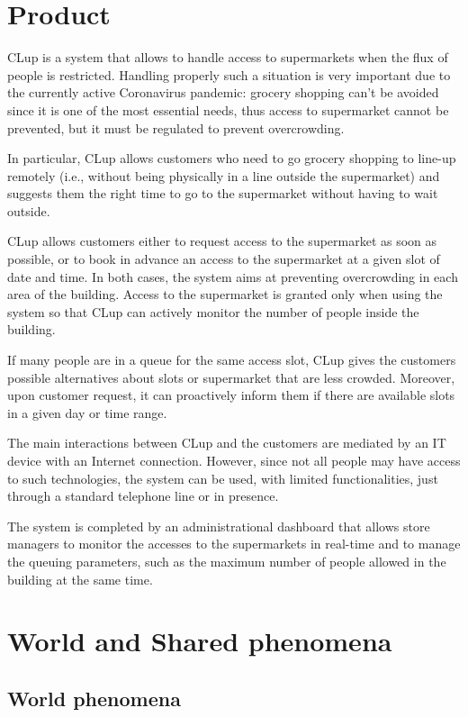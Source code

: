 \documentclass[../../main.tex]{subfiles}
\begin{document}
\section{Product}

CLup is a system that allows to handle access to supermarkets when the flux of
people is restricted. Handling properly such a situation is very important due
to the currently active Coronavirus pandemic: grocery shopping can't be avoided
since it is one of the most essential needs, thus access to supermarket cannot
be prevented, but it must be regulated to prevent overcrowding.

In particular, CLup allows customers who need to go grocery shopping to line-up
remotely (i.e., without being physically in a line outside the supermarket) and
suggests them the right time to go to the supermarket without having to wait
outside.

CLup allows customers either to request access to the supermarket as soon as
possible, or to book in advance an access to the supermarket at a given slot of
date and time. In both cases, the system aims at preventing overcrowding in each
area of the building. Access to the supermarket is granted only when using the
system so that CLup can actively monitor the number of people inside the
building.

If many people are in a queue for the same access slot, CLup gives the customers
possible alternatives about slots or supermarket that are less crowded.
Moreover, upon customer request, it can proactively inform them if there are
available slots in a given day or time range.

The main interactions between CLup and the customers are mediated by an IT
device with an Internet connection. However, since not all people may have
access to such technologies, the system can be used, with limited
functionalities, just through a standard telephone line or in presence.

The system is completed by an administrational dashboard that allows store
managers to monitor the accesses to the supermarkets in real-time and to manage
the queuing parameters, such as the maximum number of people allowed in the
building at the same time.

\section{World and Shared phenomena}

\subsection{World phenomena}
\end{document}
